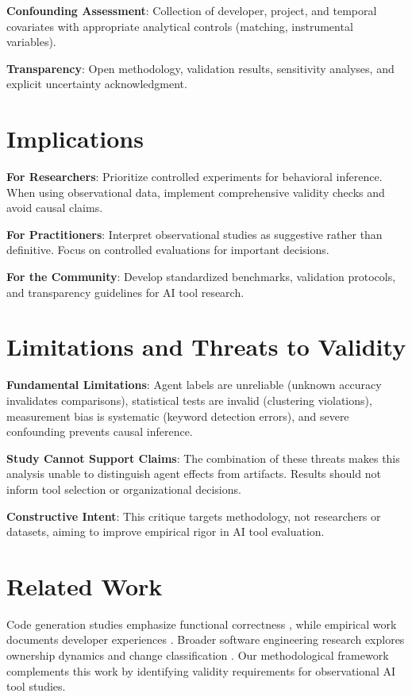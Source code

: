 \documentclass[conference]{IEEEtran}
\begin{document}
\textbf{Confounding Assessment}: Collection of developer, project, and temporal covariates with appropriate analytical controls (matching, instrumental variables).

\textbf{Transparency}: Open methodology, validation results, sensitivity analyses, and explicit uncertainty acknowledgment.

\section{Implications}

\textbf{For Researchers}: Prioritize controlled experiments for behavioral inference. When using observational data, implement comprehensive validity checks and avoid causal claims.

\textbf{For Practitioners}: Interpret observational studies as suggestive rather than definitive. Focus on controlled evaluations for important decisions.

\textbf{For the Community}: Develop standardized benchmarks, validation protocols, and transparency guidelines for AI tool research.

\section{Limitations and Threats to Validity}

\textbf{Fundamental Limitations}: Agent labels are unreliable (unknown accuracy invalidates comparisons), statistical tests are invalid (clustering violations), measurement bias is systematic (keyword detection errors), and severe confounding prevents causal inference.

\textbf{Study Cannot Support Claims}: The combination of these threats makes this analysis unable to distinguish agent effects from artifacts. Results should not inform tool selection or organizational decisions.

\textbf{Constructive Intent}: This critique targets methodology, not researchers or datasets, aiming to improve empirical rigor in AI tool evaluation.

\section{Related Work}

Code generation studies emphasize functional correctness \cite{chen2021evaluating}, while empirical work documents developer experiences \cite{bareiss2023code}. Broader software engineering research explores ownership dynamics \cite{bird2011dont} and change classification \cite{kim2008classifying}. Our methodological framework complements this work by identifying validity requirements for observational AI tool studies.
\end{document}
